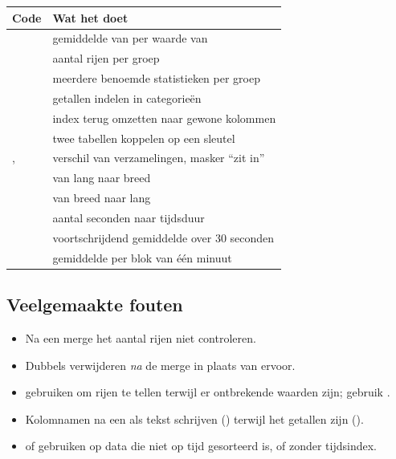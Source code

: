\documentclass[11pt,a4paper]{article}
\begin{document}
\begin{center}
\begin{tabularx}{\textwidth}{@{}L{8.4cm}Y@{}}
\toprule
\textbf{Code} & \textbf{Wat het doet} \\
\midrule
{} & gemiddelde van  per waarde van  \\
 & aantal rijen per groep \\
 & meerdere benoemde statistieken per groep \\
 & getallen indelen in categorieën \\
 & index terug omzetten naar gewone kolommen \\
 & twee tabellen koppelen op een sleutel \\
,  & verschil van verzamelingen, masker ``zit in'' \\
 & van lang naar breed \\
 & van breed naar lang \\
 & aantal seconden naar tijdsduur \\
 & voortschrijdend gemiddelde over 30 seconden \\
 & gemiddelde per blok van één minuut \\
\bottomrule
\end{tabularx}
\end{center}

\subsection*{Veelgemaakte fouten}

\begin{itemize}
  \item Na een merge het aantal rijen niet controleren.
  \item Dubbels verwijderen \emph{na} de merge in plaats van ervoor.
  \item {} gebruiken om rijen te tellen terwijl er
        ontbrekende waarden zijn; gebruik .
  \item Kolomnamen na een  als tekst schrijven
        () terwijl het getallen zijn ().
  \item {} of  gebruiken op data die niet op
        tijd gesorteerd is, of zonder tijdsindex.
\end{itemize}
\end{document}
